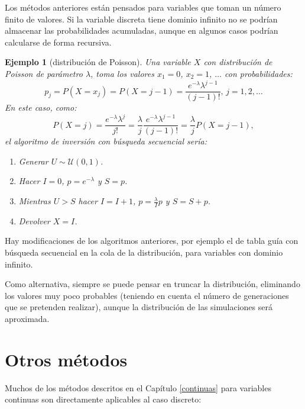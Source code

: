 \documentclass[
  10pt,
]{book}
\theoremstyle{break}
\newtheorem{example}{Ejemplo}[chapter]
\theoremstyle{nonumberplain}
\begin{document}
Los métodos anteriores están pensados para variables que toman un número finito de valores.
Si la variable discreta tiene dominio infinito no se podrían almacenar las probabilidades acumuladas, aunque en algunos casos podrían calcularse de forma recursiva.

\begin{example}[distribución de Poisson]

Una variable \(X\) con distribución de Poisson de parámetro \(\lambda\),
toma los valores \(x_{1}=0\), \(x_{2}=1\), \(\ldots\) con probabilidades:
\[p_{j}=P\left( X=x_{j}\right)  =P\left( X=j-1\right)  =\frac{e^{-\lambda
}\lambda^{j-1}}{\left( j-1\right)  !}\text{, }j=1,2,\ldots\]
En este caso, como:
\[P\left( X=j\right)  =\frac{e^{-\lambda}\lambda^{j}}{j!}
=\frac{\lambda}{j}\frac{e^{-\lambda}\lambda^{j-1}}{\left( j-1\right)  !}
=\frac{\lambda}{j}P\left( X=j-1\right),\]
el algoritmo de inversión con búsqueda secuencial sería:

\begin{enumerate}
\def\labelenumi{\arabic{enumi}.}
\item
  Generar \(U\sim \mathcal{U}\left( 0,1\right)\).
\item
  Hacer \(I=0\), \(p=e^{-\lambda}\) y \(S=p\).
\item
  Mientras \(U>S\) hacer \(I=I+1\), \(p=\frac{\lambda}{I}p\) y \(S=S+p\).
\item
  Devolver \(X=I\).
\end{enumerate}

\end{example}

Hay modificaciones de los algoritmos anteriores, por ejemplo el de tabla guía con búsqueda secuencial en la cola de la distribución, para variables con dominio infinito.

Como alternativa, siempre se puede pensar en truncar la distribución,
eliminando los valores muy poco probables (teniendo en cuenta el número de generaciones que se pretenden realizar),
aunque la distribución de las simulaciones será aproximada.

\hypertarget{otros-muxe9todos}{%
\section{Otros métodos}\label{otros-muxe9todos}}

Muchos de los métodos descritos en el Capítulo \ref{continuas} para variables continuas son directamente aplicables al caso discreto:
\end{document}
